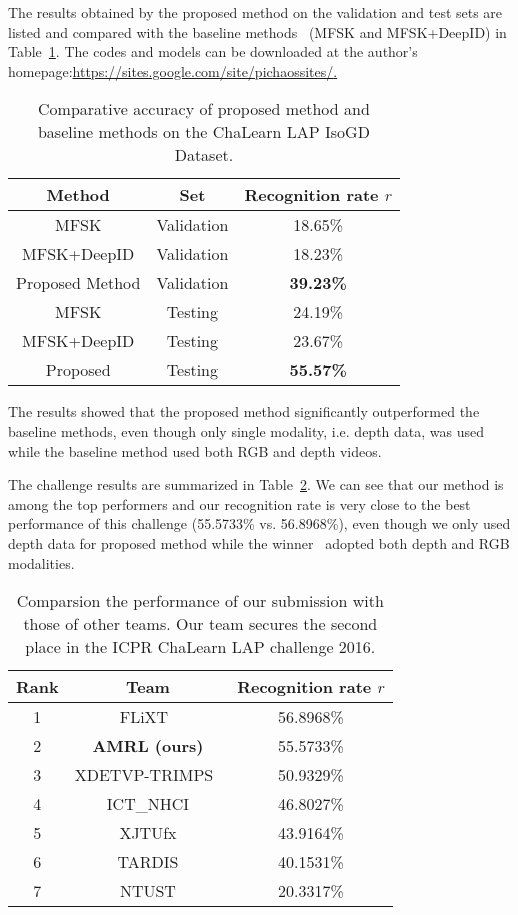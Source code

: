 \documentclass[10pt, a4paper, conference]{IEEEtran}
\begin{document}
The results obtained by the proposed method on the validation and test sets are listed and compared with the baseline methods~\cite{pami16Jun} (MFSK and MFSK+DeepID) in Table~\ref{table2}. The codes and models can be downloaded at the author's homepage:\url{https://sites.google.com/site/pichaossites/}\href{https://sites.google.com/site/pichaossites/}.

\begin{table}[!ht]
\centering
\caption{Comparative accuracy of proposed method and baseline 
methods on the ChaLearn LAP IsoGD Dataset. \label{table2}}
\begin{tabular}{|c|c|c|}
\hline
Method & Set & Recognition rate $r$\\
\hline
MFSK & Validation & 18.65\%\\
\hline
MFSK+DeepID & Validation & 18.23\%\\
\hline
Proposed Method & Validation & \textbf{39.23\%}\\
\hline
MFSK & Testing & 24.19\% \\
\hline
MFSK+DeepID & Testing & 23.67\%\\
\hline
Proposed & Testing &\textbf{55.57\%}\\
\hline
\end{tabular}
\end{table}


The results showed that the proposed method 
significantly outperformed the baseline methods, even though only single 
modality, i.e. depth data, was used while the baseline method used both RGB and 
depth videos.

The challenge results are summarized in Table~\ref{table3}. We can see that our method is among the top performers and our recognition rate is very close to the best performance of this challenge (55.5733\% vs. 56.8968\%), even though we only used depth data for proposed method while the winner~\cite{yunanli} adopted both depth and RGB modalities.

\begin{table}[!ht]
\centering
\caption{Comparsion the performance of our submission with those of other teams. Our team secures the second place in the ICPR ChaLearn LAP challenge 2016. \label{table3}}
\begin{tabular}{|c|c|c|}
\hline
Rank & Team & Recognition rate $r$\\
\hline
1 & FLiXT~\cite{yunanli} & 56.8968\%\\
\hline
2 & \textbf{AMRL (ours)} & 55.5733\%\\
\hline
3 & XDETVP-TRIMPS~\cite{guangming} & 50.9329\%\\
\hline
4 & ICT\_NHCI & 46.8027\%\\
\hline
5 & XJTUfx & 43.9164\%\\
\hline
6 & TARDIS & 40.1531\%\\
\hline
7 & NTUST & 20.3317\%\\
\hline
\end{tabular}
\end{table}
\end{document}
